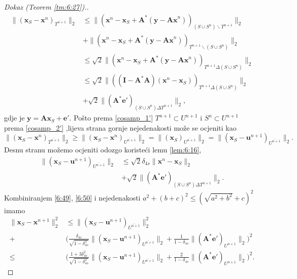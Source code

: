 \documentclass[a4paper,twoside,12pt]{memoir} %
\newcommand{\vect}[1]{\mathbf{#1}}
\renewcommand{\vec}{\vect}
\newcommand{\norm}[1]{\|{#1}\|}
\begin{document}
\begin{proof}[Dokaz (Teorem \ref{tm:6:27}).]
\begin{align*}
        \norm{(\vec x_S - \vec x^n)_{\overline{T^{n+1}}}}_2 & \leq \norm{(\vec x^n - \vec x_S + \vec A^*(\vec y - \vec{Ax}^n))_{(S \cup S^n) \backslash T^{n+1}}}_2\\[0.5em]
        & + \norm{(\vec x^n - \vec x_S + \vec A^*(\vec y - \vec{Ax}^n))_{T^{n+1} \backslash (S \cup S^n)}}_2\\[0.5em]
        & \leq \sqrt{2} \norm{(\vec x^n - \vec x_S + \vec A^*(\vec y - \vec{Ax}^n))_{T^{n+1} \Delta (S \cup S^n)}}_2\\[0.5em]
        & \leq \sqrt{2} \norm{((\vec I - \vec A^* \vec A)(\vec x^n - \vec x_S))_{T^{n+1} \Delta (S \cup S^n)}}_2\\[0.5em]
        & + \sqrt{2} \norm{(\vec A^* \vec e')_{(S \cup S^n) \Delta T^{n+1}}}_2,
    \end{align*}
    gdje je $\vec y = \vec{Ax}_S + \vec e'$. Po\v{s}to prema \eqref{cosamp_1'} $T^{n+1} \subset U^{n+1}$ i $S^n \subset U^{n+1}$ prema \eqref{cosamp_2'} ,lijeva strana gornje nejedenakosti mo\v{z}e se ocjeniti kao
    \begin{equation*}
        \norm{(\vec x_S - \vec x^n)_{\overline{T^{n+1}}}}_2 \geq \norm{(\vec x_S - \vec x^n)_{\overline{U^{n+1}}}}_2 = \norm{(\vec x_S)_{\overline{U^{n+1}}}}_2 = \norm{(\vec x_S - \vec u^{n+1})_{\overline{U^{n+1}}}}_2.
    \end{equation*}
    Desnu stranu mo\v{z}emo ocjeniti odozgo koriste\'ci lemu \ref{lem:6:16},
    \begin{align}
        \norm{(\vec x_S - \vec u^{n+1})_{\overline{U^{n+1}}}}_2 & \leq \sqrt{2} \delta_{4s} \norm{\vec x^n - \vec x_S}_2 \nonumber \\[0.5em]
            & + \sqrt{2}\norm{(\vec A^*\vec e')_{(S \cup S^n) \Delta T^{n+1}}}_2.\label{6:51}
    \end{align}
    Kombiniranjem \eqref{6:49}, \eqref{6:50} i nejedenakosti $a^2 + (b+c)^2 \leq (\sqrt{a^2 + b^2} + c)^2$ imamo
    \begin{align*}
        \norm{\vec x_S - \vec x^{n+1}}_2^2 & \leq \norm{(\vec x_S - \vec u^{n+1})_{\overline{U^{n+1}}}}_2^2\\[0.5em]
        + & \bigg( \frac{\delta_{4s}}{\sqrt{1-\delta_{4s}^2}}\norm{(\vec x_S - \vec u^{n+1})_{\overline{U^{n+1}}}}_2 + \frac{1}{1-\delta_{4s}} \norm{(\vec A^* \vec e')_{U^{n+1}}}_2   \bigg)^2\\[0.5em]
        \leq & \bigg( \frac{1+3 \delta_{4s}^2}{\sqrt{1-\delta_{4s}^2}}\norm{(\vec x_S - \vec u^{n+1})_{\overline{U^{n+1}}}}_2 + \frac{2}{1-\delta_{4s}} \norm{(\vec A^* \vec e')_{U^{n+1}}}_2   \bigg)^2.

\end{align*}
\end{proof}
\end{document}
